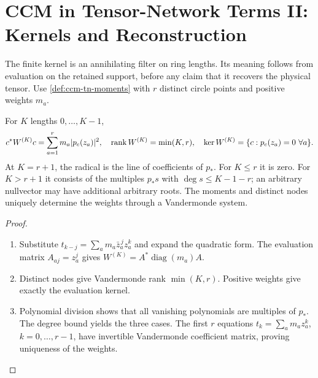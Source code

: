 
\section{CCM in Tensor-Network Terms II: Kernels and Reconstruction}
\label{sec:ccm-tn-kernel}

The finite kernel is an annihilating filter on ring lengths. Its
meaning follows from evaluation on the retained support, before any
claim that it recovers the physical tensor. Use
\cref{def:ccm-tn-moments} with $r$ distinct circle points and positive
weights $m_a$.

\begin{theorem}
\label{thm:ccm-tn-atomic-reconstruction}
For $K$ lengths $0,\ldots,K-1$,
\[
 c^*W^{(K)} c=\sum_{a=1}^r m_a|p_c(z_a)|^2,
 \quad \operatorname{rank}W^{(K)}=\min(K,r),
 \quad \ker W^{(K)}=\{c:p_c(z_a)=0\ \forall a\}.
\]
At $K=r+1$, the radical is the line of coefficients of $p_*$.
For $K\leq r$ it is zero. For $K>r+1$ it consists of the multiples
$p_*s$ with $\deg s\leq K-1-r$; an arbitrary nullvector may have
additional arbitrary roots. The moments and distinct nodes uniquely
determine the weights through a Vandermonde system.
\end{theorem}
\begin{proof}
\begin{enumerate}
\item[$\langle1\rangle$1.] Substitute
$t_{k-j}=\sum_a m_a\bar z_a^{\,j}z_a^k$ and expand the quadratic
form. The evaluation matrix $A_{aj}=z_a^j$ gives
$W^{(K)}=A^*\operatorname{diag}(m_a)A$.
\item[$\langle1\rangle$2.] Distinct nodes give Vandermonde rank
$\min(K,r)$. Positive weights give exactly the evaluation kernel.
\item[$\langle1\rangle$3.] Polynomial division shows that all
vanishing polynomials are multiples of $p_*$. The degree bound yields
the three cases. The first $r$ equations
$t_k=\sum_a m_a z_a^k$, $k=0,\ldots,r-1$, have invertible
Vandermonde coefficient matrix, proving uniqueness of the weights.
\end{enumerate}
\end{proof}

